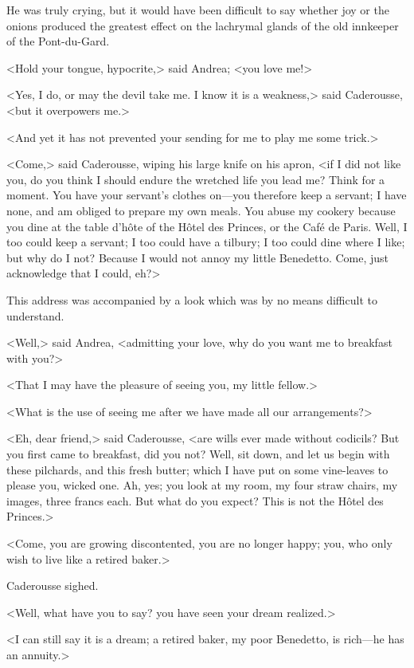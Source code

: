  He was truly crying, but it would have been difficult to say whether joy or the onions produced the greatest effect on the lachrymal glands of the old innkeeper of the Pont-du-Gard. 

 <Hold your tongue, hypocrite,> said Andrea; <you love me!> 

 <Yes, I do, or may the devil take me. I know it is a weakness,> said Caderousse, <but it overpowers me.> 

 <And yet it has not prevented your sending for me to play me some trick.> 

 <Come,> said Caderousse, wiping his large knife on his apron, <if I did not like you, do you think I should endure the wretched life you lead me? Think for a moment. You have your servant's clothes on—you therefore keep a servant; I have none, and am obliged to prepare my own meals. You abuse my cookery because you dine at the table d'hôte of the Hôtel des Princes, or the Café de Paris. Well, I too could keep a servant; I too could have a tilbury; I too could dine where I like; but why do I not? Because I would not annoy my little Benedetto. Come, just acknowledge that I could, eh?> 

 This address was accompanied by a look which was by no means difficult to understand. 

 <Well,> said Andrea, <admitting your love, why do you want me to breakfast with you?> 

 <That I may have the pleasure of seeing you, my little fellow.> 

 <What is the use of seeing me after we have made all our arrangements?> 

 <Eh, dear friend,> said Caderousse, <are wills ever made without codicils? But you first came to breakfast, did you not? Well, sit down, and let us begin with these pilchards, and this fresh butter; which I have put on some vine-leaves to please you, wicked one. Ah, yes; you look at my room, my four straw chairs, my images, three francs each. But what do you expect? This is not the Hôtel des Princes.> 

 <Come, you are growing discontented, you are no longer happy; you, who only wish to live like a retired baker.> 

 Caderousse sighed. 

 <Well, what have you to say? you have seen your dream realized.> 

 <I can still say it is a dream; a retired baker, my poor Benedetto, is rich—he has an annuity.> 


